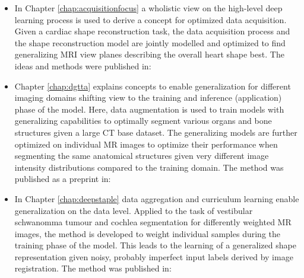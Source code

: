             \begin{itemize}
                \item
                    In Chapter \ref{chap:acquisitionfocus} a wholistic view on the  high-level deep learning process is used to derive a concept for optimized data acquisition. Given a cardiac shape reconstruction task, the data acquisition process and the shape reconstruction model are jointly modelled and optimized to find generalizing MRI view planes describing the overall heart shape best. The ideas and methods were published in:

                    \vspace{1em}
                    \noindent{}

                    \vspace{1em}
                    \noindent{}

                \item
                    Chapter \ref{chap:dgtta} explains concepts to enable generalization for different imaging domains shifting view to the training and inference (application) phase of the model. Here, data augmentation is used to train models with generalizing capabilities to optimally segment various organs and bone structures given a large CT base dataset. The generalizing models are further optimized on individual MR images to optimize their performance when segmenting the same anatomical structures given very different image intensity distributions compared to the training domain. The method was published as a preprint in:

                    \vspace{1em}
                    \noindent{}

                \item
                    In Chapter \ref{chap:deepstaple} data aggregation and curriculum learning enable generalization on the data level. Applied to the task of vestibular schwanomma tumour and cochlea segmentation for differently weighted MR images, the method is developed to weight individual samples during the training phase of the model. This leads to the learning of a generalized shape representation given noisy, probably imperfect input labels derived by image registration. The method was published in:

                    \vspace{1em}
                    \noindent{}


\end{itemize}
